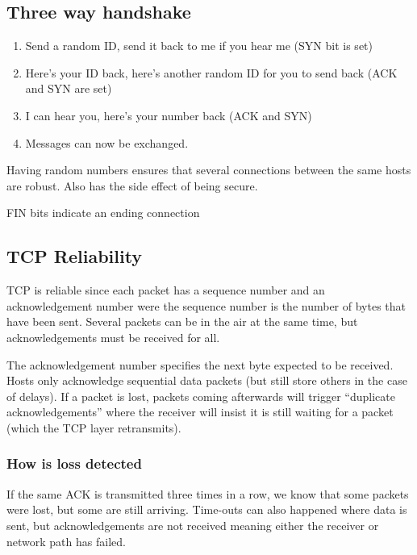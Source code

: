 \subsection{Three way handshake}\label{sub:three_way_handshake}

\begin{enumerate}
	\item Send a random ID, send it back to me if you hear me (SYN bit is set)
	\item Here's your ID back, here's another random ID for you to send back (ACK and SYN are set)
	\item I can hear you, here's your number back (ACK and SYN)
	\item Messages can now be exchanged.
\end{enumerate}
Having random numbers ensures that several connections between the same hosts are robust.
Also has the side effect of being secure.

\begin{note}
	FIN bits indicate an ending connection
\end{note}

\subsection{TCP Reliability}\label{sub:tcp_reliability}

TCP is reliable since each packet has a sequence number and an acknowledgement number were the sequence number is the number of bytes that have been sent.
Several packets can be in the air at the same time, but acknowledgements must be received for all.

The acknowledgement number specifies the next byte expected to be received.
Hosts only acknowledge sequential data packets (but still store others in the case of delays).
If a packet is lost, packets coming afterwards will trigger ``duplicate acknowledgements'' where the receiver will insist it is still waiting for a packet (which the TCP layer retransmits).

\subsubsection{How is loss detected}\label{ssub:how_is_loss_detected}

If the same ACK is transmitted three times in a row, we know that some packets were lost, but some are still arriving.
Time-outs can also happened where data is sent, but acknowledgements are not received meaning either the receiver or network path has failed.

